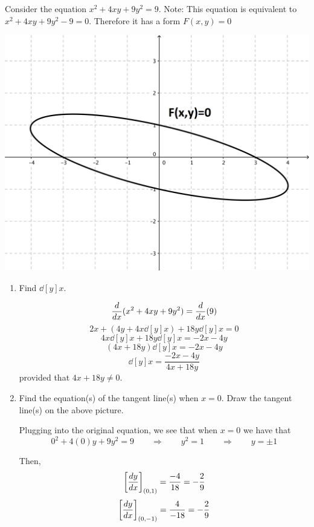 \documentclass[nooutcomes,handout]{ximera}
\begin{document}
\begin{problem}
Consider the equation $x^2 + 4xy + 9y^2 = 9$.  Note: This equation is equivalent to $x^2 + 4xy + 9y^2 - 9=0$.  Therefore it has a form $F(x,y)=0$

\begin{image}
\includegraphics[scale=.2]{figure1.png}
\end{image}

	\begin{enumerate}
	
	\item  Find $\dd[y]{x}$.
		\begin{freeResponse}
		$$ \ddx(x^2 + 4xy + 9y^2) = \ddx(9) $$
		$$ 2x + \left(4y + 4x \dd[y]{x} \right) + 18 y \dd[y]{x} = 0 $$
		$$ 4x \dd[y]{x} + 18y \dd[y]{x} = -2x - 4y $$
		$$ (4x+18y) \dd[y]{x} = -2x-4y $$
		$$ \dd[y]{x} = \frac{-2x-4y}{4x+18y} $$
		provided that $4x+18y \neq 0$.
		\end{freeResponse}
		
		
		
	\item  Find the equation(s) of the tangent line(s) when $x=0$.  Draw the tangent line(s) on the above picture.
		\begin{freeResponse}
		Plugging into the original equation, we see that when $x=0$ we have that 
		$$ 0^2 + 4(0)y + 9y^2 = 9 \qquad \Longrightarrow \qquad y^2 = 1 \qquad \Longrightarrow \qquad y = \pm 1 $$
		
		Then,
		$$\eval{\dd[y]{x}}_{(0,1)} = \frac{-4}{18} = -\frac{2}{9}$$
		$$\eval{\dd[y]{x}}_{(0,-1)} = \frac{4}{-18} = -\frac{2}{9} $$
		

\end{freeResponse}
\end{enumerate}
\end{problem}
\end{document}

